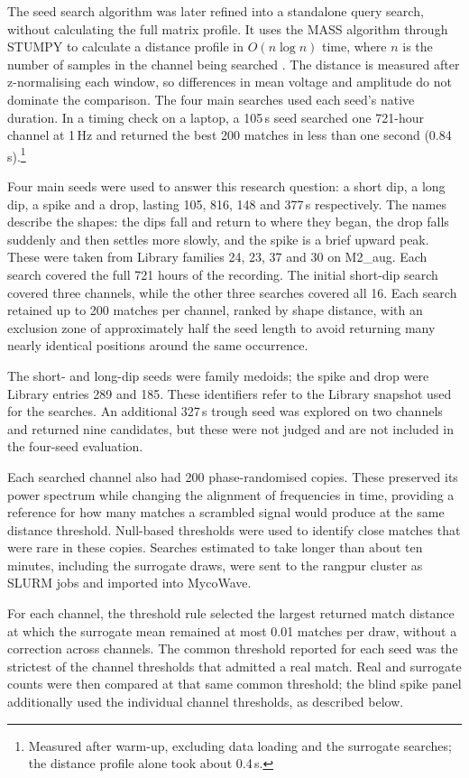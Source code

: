 The seed search algorithm was later refined into a standalone query search, without calculating the full matrix profile. It uses the MASS algorithm through STUMPY to calculate a distance profile in $O(n\log n)$ time, where $n$ is the number of samples in the channel being searched \cite{mass2022,stumpy}. The distance is measured after z-normalising each window, so differences in mean voltage and amplitude do not dominate the comparison. The four main searches used each seed's native duration. In a timing check on a laptop, a 105\,s seed searched one 721-hour channel at 1\,Hz and returned the best 200 matches in less than one second (0.84\,s).\footnote{Measured after warm-up, excluding data loading and the surrogate searches; the distance profile alone took about 0.4\,s.}

Four main seeds were used to answer this research question: a short dip, a long dip, a spike and a drop, lasting 105, 816, 148 and 377\,s respectively. The names describe the shapes: the dips fall and return to where they began, the drop falls suddenly and then settles more slowly, and the spike is a brief upward peak. These were taken from Library families 24, 23, 37 and 30 on M2\_aug. Each search covered the full 721 hours of the recording. The initial short-dip search covered three channels, while the other three searches covered all 16. Each search retained up to 200 matches per channel, ranked by shape distance, with an exclusion zone of approximately half the seed length to avoid returning many nearly identical positions around the same occurrence.

The short- and long-dip seeds were family medoids; the spike and drop were Library entries 289 and 185. These identifiers refer to the Library snapshot used for the searches. An additional 327\,s trough seed was explored on two channels and returned nine candidates, but these were not judged and are not included in the four-seed evaluation.

Each searched channel also had 200 phase-randomised copies. These preserved its power spectrum while changing the alignment of frequencies in time, providing a reference for how many matches a scrambled signal would produce at the same distance threshold. Null-based thresholds were used to identify close matches that were rare in these copies. Searches estimated to take longer than about ten minutes, including the surrogate draws, were sent to the rangpur cluster as SLURM jobs and imported into MycoWave.

For each channel, the threshold rule selected the largest returned match distance at which the surrogate mean remained at most 0.01 matches per draw, without a correction across channels. The common threshold reported for each seed was the strictest of the channel thresholds that admitted a real match. Real and surrogate counts were then compared at that same common threshold; the blind spike panel additionally used the individual channel thresholds, as described below.

